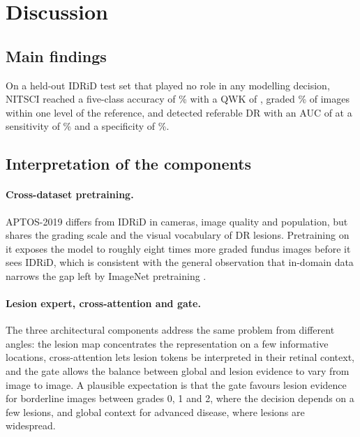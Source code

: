 \section{Discussion}\label{sec:discussion}
\subsection{Main findings}
On a held-out IDRiD test set that played no role in any modelling decision, NITSCI reached a five-class accuracy of
\% with a QWK of , graded \% of images within one level of the reference, and
detected referable DR with an AUC of  at a sensitivity of \% and a specificity of
\%. 

\subsection{Interpretation of the components}
\paragraph{Cross-dataset pretraining.} APTOS-2019 differs from IDRiD in cameras, image quality and population, but
shares the grading scale and the visual vocabulary of DR lesions. Pretraining on it exposes the model to roughly eight
times more graded fundus images before it sees IDRiD, which is consistent with the general observation that
in-domain data narrows the gap left by ImageNet pretraining \citep{raghu2019transfusion}. 

\paragraph{Lesion expert, cross-attention and gate.} The three architectural components address the same problem from
different angles: the lesion map concentrates the representation on a few informative locations, cross-attention
lets lesion tokens be interpreted in their retinal context, and the gate allows the balance between global and lesion
evidence to vary from image to image. A plausible expectation is that the gate favours lesion evidence for borderline
images between grades 0, 1 and 2, where the decision depends on a few lesions, and global context for advanced
disease, where lesions are widespread. 

